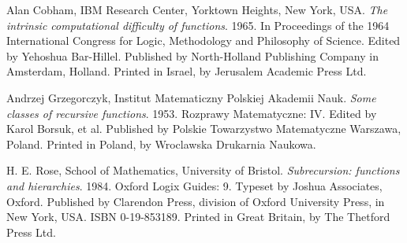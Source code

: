\begin{thebibliography}{9} %


Alan Cobham, IBM Research Center, Yorktown Heights, New York, USA. \emph{The
intrinsic computational difficulty of functions}. 1965. In Proceedings of the
1964 International Congress for Logic, Methodology and Philosophy of Science.
Edited by Yehoshua Bar-Hillel. Published by North-Holland Publishing Company in
Amsterdam, Holland.  Printed in Israel, by Jerusalem Academic Press Ltd.


Andrzej Grzegorczyk, Institut Matematiczny Polskiej Akademii Nauk. \emph{Some
classes of recursive functions}. 1953. Rozprawy Matematyczne: IV. Edited by
Karol Borsuk, et al. Published by Polskie Towarzystwo Matematyczne Warszawa,
Poland. Printed in Poland, by Wroclawska Drukarnia Naukowa.


H. E. Rose, School of Mathematics, University of Bristol. \emph{Subrecursion:
functions and hierarchies}. 1984. Oxford Logix Guides: 9. Typeset by Joshua
Associates, Oxford.  Published by Clarendon Press, division of Oxford
University Press, in New York, USA. ISBN 0-19-853189. Printed in Great Britain,
by The Thetford Press Ltd.

\end{thebibliography}
